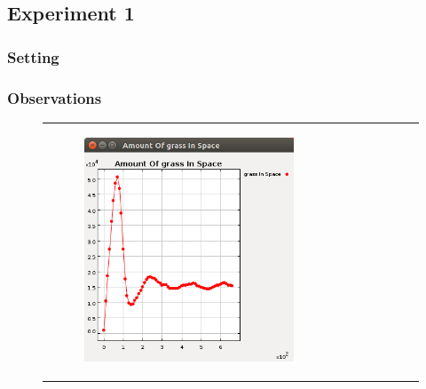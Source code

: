 \documentclass[11pt]{article}
\begin{document}
\subsection{Experiment 1}

\subsubsection{Setting}

\subsubsection{Observations}
\begin{figure}

    \begin{adjustbox}{width=\textwidth,center}
    \begin{tabular}{c c}
         \begin{subfigure}[b]{\textwidth}
        \includegraphics[width=\textwidth]{experiment/1/Grass.png}
        \caption{\label{img:grass1} }
    \end{subfigure} & 
    \begin{subfigure}[b]{\textwidth}

\end{subfigure}
\end{tabular}
\end{adjustbox}
\end{figure}
\end{document}
